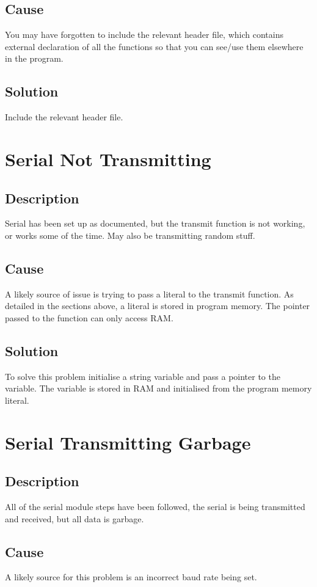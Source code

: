 \documentclass[]{report}
\begin{document}
\subsection{Cause}
You may have forgotten to include the relevant header file, which contains external declaration of all the functions so that you can see/use them elsewhere in the program.

\subsection{Solution}
Include the relevant header file.

\section{Serial Not Transmitting}
\subsection{Description}
Serial has been set up as documented, but the transmit function is not working,
or works some of the time. May also be transmitting random stuff.

\subsection{Cause}
A likely source of issue is trying to pass a literal to the transmit function. As
detailed in the sections above, a literal is stored in program memory. The
pointer passed to the function can only access RAM.

\subsection{Solution}
To solve this problem initialise a string variable and pass a pointer to the variable. The variable is stored in RAM and initialised from the program memory literal.

\section{Serial Transmitting Garbage}
\subsection{Description}
All of the serial module steps have been followed, the serial is being transmitted
and received, but all data is garbage.

\subsection{Cause}
A likely source for this problem is an incorrect baud rate being set.
\end{document}
